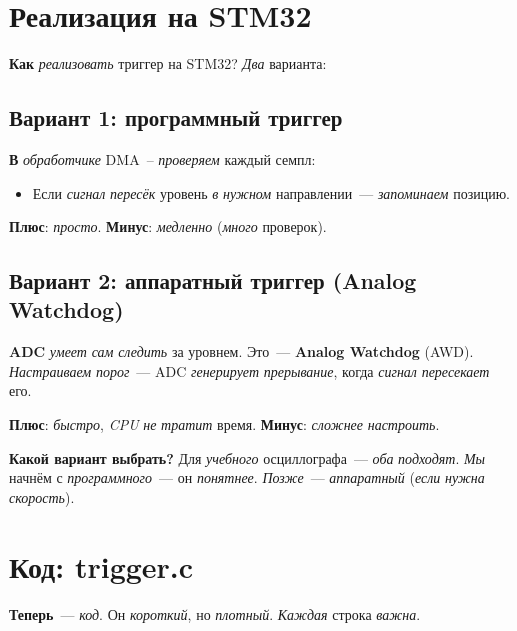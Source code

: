 \section{Реализация на STM32}
\label{sec:trigger-impl}

\textbf{Как} \emph{реализовать} триггер на STM32? \emph{Два}
варианта:

\subsection{Вариант 1: программный триггер}

\textbf{В} \emph{обработчике} DMA~\--- \emph{проверяем}
каждый семпл:
\begin{itemize}
    \item Если \emph{сигнал} \emph{пересёк} уровень \emph{в}
          \emph{нужном} направлении~--- \emph{запоминаем}
          позицию.
\end{itemize}

\textbf{Плюс}: \emph{просто}.
\textbf{Минус}: \emph{медленно} (\emph{много} проверок).

\subsection{Вариант 2: аппаратный триггер (Analog Watchdog)}

\textbf{ADC} \emph{умеет} \emph{сам} \emph{следить} за
уровнем. Это~--- \textbf{Analog Watchdog} (AWD).
\emph{Настраиваем} \emph{порог}~--- ADC \emph{генерирует}
\emph{прерывание}, когда \emph{сигнал} \emph{пересекает}
его.

\textbf{Плюс}: \emph{быстро}, \emph{CPU} \emph{не} \emph{тратит}
время.
\textbf{Минус}: \emph{сложнее} \emph{настроить}.

\begin{ideabox}
\textbf{Какой вариант выбрать?} Для \emph{учебного}
осциллографа~--- \emph{оба} \emph{подходят}. \emph{Мы}
начнём с \emph{программного}~--- он \emph{понятнее}.
\emph{Позже}~--- \emph{аппаратный} (\emph{если} \emph{нужна}
\emph{скорость}).
\end{ideabox}





\section{Код: trigger.c}
\label{sec:trigger-code}

\textbf{Теперь}~--- \emph{код}. Он \emph{короткий}, но
\emph{плотный}. \emph{Каждая} строка \emph{важна}.

